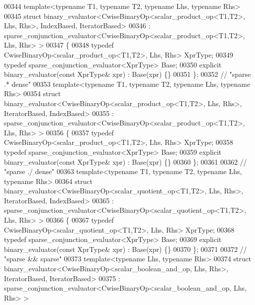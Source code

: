 \begin{DoxyCode}
00344 \textcolor{keyword}{template}<\textcolor{keyword}{typename} T1, \textcolor{keyword}{typename} T2, \textcolor{keyword}{typename} Lhs, \textcolor{keyword}{typename} Rhs>
00345 \textcolor{keyword}{struct }binary\_evaluator<CwiseBinaryOp<scalar\_product\_op<T1,T2>, Lhs, Rhs>, IndexBased, IteratorBased>
00346   : sparse\_conjunction\_evaluator<CwiseBinaryOp<scalar\_product\_op<T1,T2>, Lhs, Rhs> >
00347 \{
00348   \textcolor{keyword}{typedef} CwiseBinaryOp<scalar\_product\_op<T1,T2>, Lhs, Rhs> XprType;
00349   \textcolor{keyword}{typedef} sparse\_conjunction\_evaluator<XprType> Base;
00350   \textcolor{keyword}{explicit} binary\_evaluator(\textcolor{keyword}{const} XprType& xpr) : Base(xpr) \{\}
00351 \};
00352 \textcolor{comment}{// "sparse .* dense"}
00353 \textcolor{keyword}{template}<\textcolor{keyword}{typename} T1, \textcolor{keyword}{typename} T2, \textcolor{keyword}{typename} Lhs, \textcolor{keyword}{typename} Rhs>
00354 \textcolor{keyword}{struct }binary\_evaluator<CwiseBinaryOp<scalar\_product\_op<T1,T2>, Lhs, Rhs>, IteratorBased, IndexBased>
00355   : sparse\_conjunction\_evaluator<CwiseBinaryOp<scalar\_product\_op<T1,T2>, Lhs, Rhs> >
00356 \{
00357   \textcolor{keyword}{typedef} CwiseBinaryOp<scalar\_product\_op<T1,T2>, Lhs, Rhs> XprType;
00358   \textcolor{keyword}{typedef} sparse\_conjunction\_evaluator<XprType> Base;
00359   \textcolor{keyword}{explicit} binary\_evaluator(\textcolor{keyword}{const} XprType& xpr) : Base(xpr) \{\}
00360 \};
00361 
00362 \textcolor{comment}{// "sparse ./ dense"}
00363 \textcolor{keyword}{template}<\textcolor{keyword}{typename} T1, \textcolor{keyword}{typename} T2, \textcolor{keyword}{typename} Lhs, \textcolor{keyword}{typename} Rhs>
00364 \textcolor{keyword}{struct }binary\_evaluator<CwiseBinaryOp<scalar\_quotient\_op<T1,T2>, Lhs, Rhs>, IteratorBased, IndexBased>
00365   : sparse\_conjunction\_evaluator<CwiseBinaryOp<scalar\_quotient\_op<T1,T2>, Lhs, Rhs> >
00366 \{
00367   \textcolor{keyword}{typedef} CwiseBinaryOp<scalar\_quotient\_op<T1,T2>, Lhs, Rhs> XprType;
00368   \textcolor{keyword}{typedef} sparse\_conjunction\_evaluator<XprType> Base;
00369   \textcolor{keyword}{explicit} binary\_evaluator(\textcolor{keyword}{const} XprType& xpr) : Base(xpr) \{\}
00370 \};
00371 
00372 \textcolor{comment}{// "sparse && sparse"}
00373 \textcolor{keyword}{template}<\textcolor{keyword}{typename} Lhs, \textcolor{keyword}{typename} Rhs>
00374 \textcolor{keyword}{struct }binary\_evaluator<CwiseBinaryOp<scalar\_boolean\_and\_op, Lhs, Rhs>, IteratorBased, IteratorBased>
00375   : sparse\_conjunction\_evaluator<CwiseBinaryOp<scalar\_boolean\_and\_op, Lhs, Rhs> >

\end{DoxyCode}
